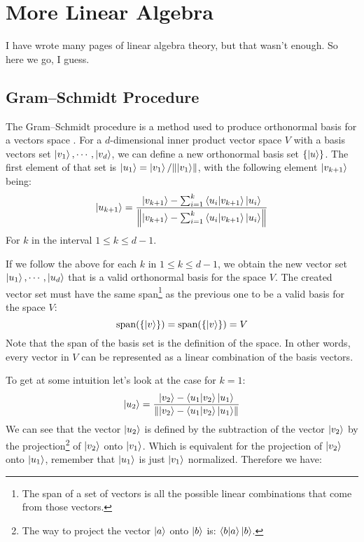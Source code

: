 \chapter{More Linear Algebra}
I have wrote many pages of linear algebra theory, but that wasn't enough. So here we go, I guess.

\section{Gram–Schmidt Procedure}\label{gram}
The Gram–Schmidt procedure is a method used to produce orthonormal basis for a vectors space \cite{QCandQI:GramSchmidt}. For a $d$-dimensional inner product vector space $V$ with a basis vectors set $\ket{v_1}, \cdots, \ket{v_d}$, we can define a new orthonormal basis set $\{\ket{u}\}$. The first element of that set is $\ket{u_1} = \ket{v_1}/\norm{\ket{v_1}}$, with the following element $\ket{v_{k+1}}$  being:
$$
\ket{u_{k+1}} = \frac{\ket{v_{k+1}} - \sum_{i=1}^{k} \bra{u_i}\ket{v_{k+1}}\ket{u_i}}{\norm{\ket{v_{k+1}} - \sum_{i=1}^{k} \bra{u_i}\ket{v_{k+1}}\ket{u_i}}}
$$
For $k$ in the interval $1 \leq k \leq d-1$.

If we follow the above for each $k$ in $1 \leq k \leq d-1$, we obtain the new vector set $\ket{u_1}, \cdots , \ket{u_d}$ that is a valid orthonormal basis for the space $V$. The created vector set must have the same span\footnote{The span of a set of vectors is all the possible linear combinations that come from those vectors.} as the previous one to be a valid basis for the space $V$:
$$
\text{span}(\{\ket{v}\}) = \text{span}(\{\ket{v}\}) = V
$$
Note that the span of the basis set is the definition of the space. In other words, every vector in $V$ can be represented as a linear combination of the basis vectors. 

To get at some intuition let's look at the case for $k=1$:
$$
\ket{u_2} = \frac{\ket{v_2} - \bra{u_1}\ket{v_2}\ket{u_1}}{\norm{\ket{v_2} - \bra{u_1}\ket{v_2}\ket{u_1}}}
$$
We can see that the vector $\ket{u_2}$ is defined by the subtraction of the vector $\ket{v_2}$ by the projection\footnote{The way to project the vector $\ket{a}$ onto $\ket{b}$ is: $\bra{b}\ket{a}\ket{b}$.} of $\ket{v_2}$ onto $\ket{v_1}$. Which is equivalent for the projection of $\ket{v_2}$ onto $\ket{u_1}$, remember that $\ket{u_1}$ is just $\ket{v_1}$ normalized. Therefore we have: 
\begin{figure}
\end{figure}


